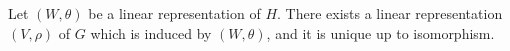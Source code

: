 Let $(W, \theta)$ be a linear representation of $H$. There exists a linear representation $(V, \rho)$ of $G$ which is induced by $(W, \theta)$, and it is unique up to isomorphism.
